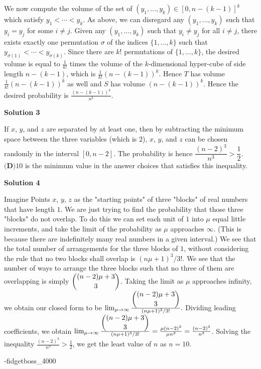 \begin{enumerate}
 We now compute the volume of the set of $(y_{1},\dotsc,y_{k}) \in [0,n-(k-1)]^{k}$ which satisfy $y_{1} < \dotsb < y_{k}$. As above, we can disregard any $(y_{1},\dotsc,y_{k})$ such that $y_{i} = y_{j}$ for some $i \ne j$. Given any $(y_{1},\dotsc,y_{k})$ such that $y_{i} \ne y_{j}$ for all $i \ne j$, there exists exactly one permutation $\sigma$ of the indices $\{1,\dotsc,k\}$ such that $y_{\sigma(1)} < \dotsb < y_{\sigma(k)}$. Since there are $k!$ permutations of $\{1,\dotsc,k\}$, the desired volume is equal to $\frac{1}{k!}$ times the volume of the $k$-dimensional hyper-cube of side length $n-(k-1)$, which is $\frac{1}{k!}(n-(k-1))^{k}$. Hence $T$ has volume $\frac{1}{k!}(n-(k-1))^{k}$ as well and $S$ has volume $(n-(k-1))^{k}$. Hence the desired probability is $\frac{(n-(k-1))^{k}}{n^{k}}$.

 



\textbf{Solution 3}

If $x$, $y$, and $z$ are separated by at least one, then by subtracting the minimum space between the three variables (which is $2$), $x$, $y$, and $z$ can be chosen randomly in the interval $[0,n-2]$. The probability is hence $\dfrac{(n-2)^3}{n^3} > \dfrac{1}{2}.$ $\boxed{\textbf{(D)} 10}$ is the minimum value in the answer choices that satisfies this inequality.

 



\textbf{Solution 4}

Imagine Points $x$, $y$, $z$ as the "starting points" of three "blocks" of real numbers that have length $1$. We are just trying to find the probability that those three "blocks" do not overlap. To do this we can set each unit of $1$ into $\mu$ equal little increments, and take the limit of the probability as $\mu$ approaches $\infty$. (This is because there are indefinitely many real numbers in a given interval.) We see that the total number of arrangements for the three blocks of $1$, without considering the rule that no two blocks shall overlap is $(n\mu + 1)^3$/3!. We see that the number of ways to arrange the three blocks such that no three of them are overlapping is simply $\dbinom{(n-2)\mu + 3}{3}$. Taking the limit as $\mu$ approaches infinity, we obtain our closed form to be $\lim_{\mu \to \infty} \frac{\dbinom{(n-2)\mu + 3}{3}}{ (n\mu + 1)^3/3!  }.$ Dividing leading coefficients, we obtain $\lim_{\mu \to \infty} \frac{\dbinom{(n-2)\mu + 3}{3}}{ (n\mu + 1)^3/3!  } =   \frac{\mu(n-2)^3}{\mu n^3} = \frac{(n-2)^3}{n^3}$. Solving the inequality $\frac{(n-2)^3}{n^3} > \frac{1}{2}$, we get the least value of $n$ as $n=\boxed{10}$.

 -fidgetboss\_4000

 


\end{enumerate}